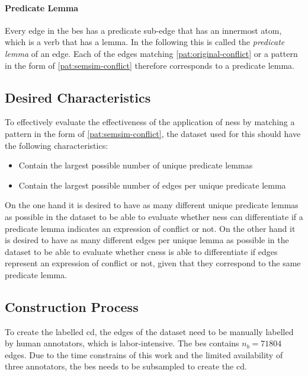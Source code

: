 \documentclass[11pt, numbers=noenddot]{scrreprt}
\begin{document}
\paragraph{Predicate Lemma} Every edge in the \gls{bes} has a predicate sub-edge that has an innermost atom, which is a verb that has a lemma. In the following this is called the \textit{predicate lemma} of an edge. Each of the edges matching \cref{pat:original-conflict} or a pattern in the form of \cref{pat:semsim-conflict} therefore corresponds to a predicate lemma.


\subsection{Desired Characteristics}
\label{sec:dataset-characteristics}
To effectively evaluate the effectiveness of the application of \gls{ness} by matching a pattern in the form of \cref{pat:semsim-conflict}, the dataset used for this should have the following characteristics:

\begin{itemize}
	\item Contain the largest possible number of unique predicate lemmas
	\item Contain the largest possible number of edges per unique predicate lemma
\end{itemize}

On the one hand it is desired to have as many different unique predicate lemmas as possible in the dataset to be able to evaluate whether \gls{ness} can differentiate if a predicate lemma indicates an expression of conflict or not. On the other hand it is desired to have as many different edges per unique lemma as possible in the dataset to be able to evaluate whether \gls{cness} is able to differentiate if edges represent an expression of conflict or not, given that they correspond to the same predicate lemma.

\subsection{Construction Process}
To create the labelled \gls{cd}, the edges of the dataset need to be manually labelled by human annotators, which is labor-intensive. The \gls{bes} contains \(n_b=71804\) edges. Due to the time constrains of this work and the limited availability of three annotators, the \gls{bes} needs to be subsampled to create the \gls{cd}. 
\end{document}
